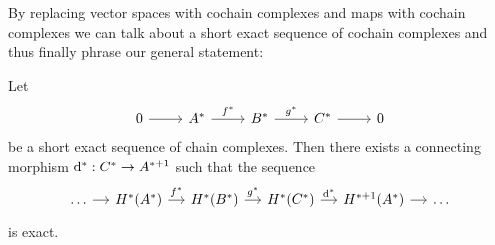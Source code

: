 By replacing vector spaces with cochain complexes and maps with cochain complexes we can
talk about a short exact sequence of cochain complexes and thus finally phrase our general
statement:
\begin{theorem}
Let
\[\begin{tikzcd}
	0 & {A^*} & {B^*} & {C^*} & 0
	\arrow[from=1-1, to=1-2]
	\arrow["{f^*}", from=1-2, to=1-3]
	\arrow["{g^*}", from=1-3, to=1-4]
	\arrow[from=1-4, to=1-5]
\end{tikzcd}\]
be a short exact sequence of chain complexes. Then there exists a connecting morphism
$\mathrm{d}^*: C^* \to A^{* + 1}$ such that the sequence
\[\begin{tikzcd}[column sep=small]
	\dots & {H^*(A^*)} & {H^*(B^*)} & {H^*(C^*)} & {H^{* + 1}(A^*)} & \dots
	\arrow[from=1-1, to=1-2]
	\arrow["{f^*}", from=1-2, to=1-3]
	\arrow["{g^*}", from=1-3, to=1-4]
	\arrow["{\mathrm{d}^*}", from=1-4, to=1-5]
	\arrow[from=1-5, to=1-6]
\end{tikzcd}\]
is exact.
\end{theorem}
